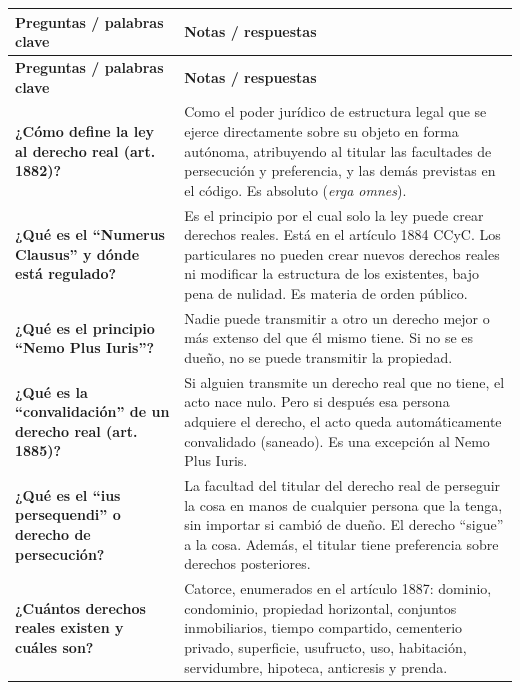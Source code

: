 \documentclass[12pt,oneside]{book}
\begin{document}
\begin{longtable}{
    >{\raggedright\arraybackslash}p{}
    >{\raggedright\arraybackslash}p{}
}
\toprule
\textbf{Preguntas / palabras clave} & \textbf{Notas / respuestas} \\
\midrule
\endfirsthead
\toprule
\textbf{Preguntas / palabras clave} & \textbf{Notas / respuestas} \\
\midrule
\endhead

\textbf{¿C\'omo define la ley al derecho real (art. 1882)?} &
Como el poder jur\'idico de estructura legal que se ejerce directamente sobre su objeto en forma aut\'onoma, atribuyendo al titular las facultades de persecuci\'on y preferencia, y las dem\'as previstas en el c\'odigo. Es absoluto (\textit{erga omnes}). \\[0.6em]

\textbf{¿Qu\'e es el ``Numerus Clausus'' y d\'onde est\'a regulado?} &
Es el principio por el cual solo la ley puede crear derechos reales. Est\'a en el art\'iculo 1884 CCyC. Los particulares no pueden crear nuevos derechos reales ni modificar la estructura de los existentes, bajo pena de nulidad. Es materia de orden p\'ublico. \\[0.6em]

\textbf{¿Qu\'e es el principio ``Nemo Plus Iuris''?} &
Nadie puede transmitir a otro un derecho mejor o m\'as extenso del que \'el mismo tiene. Si no se es due\~no, no se puede transmitir la propiedad. \\[0.6em]

\textbf{¿Qu\'e es la ``convalidaci\'on'' de un derecho real (art. 1885)?} &
Si alguien transmite un derecho real que no tiene, el acto nace nulo. Pero si despu\'es esa persona adquiere el derecho, el acto queda autom\'aticamente convalidado (saneado). Es una excepci\'on al Nemo Plus Iuris. \\[0.6em]

\textbf{¿Qu\'e es el ``ius persequendi'' o derecho de persecuci\'on?} &
La facultad del titular del derecho real de perseguir la cosa en manos de cualquier persona que la tenga, sin importar si cambi\'o de due\~no. El derecho ``sigue'' a la cosa. Adem\'as, el titular tiene preferencia sobre derechos posteriores. \\[0.6em]

\textbf{¿Cu\'antos derechos reales existen y cu\'ales son?} &
Catorce, enumerados en el art\'iculo 1887: dominio, condominio, propiedad horizontal, conjuntos inmobiliarios, tiempo compartido, cementerio privado, superficie, usufructo, uso, habitaci\'on, servidumbre, hipoteca, anticresis y prenda. \\[0.6em]


\end{longtable}
\end{document}
